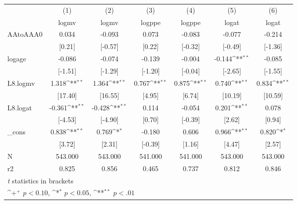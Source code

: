 {
\def\sym#1{\ifmmode^{#1}\else\(^{#1}\)\fi}
\begin{tabular}{l*{6}{c}}
\hline\hline
            &\multicolumn{1}{c}{(1)}&\multicolumn{1}{c}{(2)}&\multicolumn{1}{c}{(3)}&\multicolumn{1}{c}{(4)}&\multicolumn{1}{c}{(5)}&\multicolumn{1}{c}{(6)}\\
            &\multicolumn{1}{c}{logmv}&\multicolumn{1}{c}{logmv}&\multicolumn{1}{c}{logppe}&\multicolumn{1}{c}{logppe}&\multicolumn{1}{c}{logat}&\multicolumn{1}{c}{logat}\\
\hline
AAtoAAA0    &       0.034        &      -0.093        &       0.073        &      -0.083        &      -0.077        &      -0.214        \\
            &      [0.21]        &     [-0.57]        &      [0.22]        &     [-0.32]        &     [-0.49]        &     [-1.36]        \\
logage      &      -0.086        &      -0.074        &      -0.139        &      -0.004        &      -0.144\sym{**}&      -0.085        \\
            &     [-1.51]        &     [-1.29]        &     [-1.20]        &     [-0.04]        &     [-2.65]        &     [-1.55]        \\
L8.logmv    &       1.318\sym{**}&       1.364\sym{**}&       0.767\sym{**}&       0.875\sym{**}&       0.740\sym{**}&       0.834\sym{**}\\
            &     [17.40]        &     [16.55]        &      [4.95]        &      [6.74]        &     [10.19]        &     [10.59]        \\
L8.logat    &      -0.361\sym{**}&      -0.428\sym{**}&       0.114        &      -0.054        &       0.201\sym{**}&       0.078        \\
            &     [-4.53]        &     [-4.90]        &      [0.70]        &     [-0.39]        &      [2.62]        &      [0.94]        \\
\_cons      &       0.838\sym{**}&       0.769\sym{*} &      -0.180        &       0.606        &       0.966\sym{**}&       0.820\sym{*} \\
            &      [3.72]        &      [2.31]        &     [-0.39]        &      [1.16]        &      [4.47]        &      [2.57]        \\
\hline
N           &     543.000        &     543.000        &     541.000        &     541.000        &     543.000        &     543.000        \\
r2          &       0.825        &       0.856        &       0.465        &       0.737        &       0.812        &       0.846        \\
\hline\hline
\multicolumn{7}{l}{\footnotesize \textit{t} statistics in brackets}\\
\multicolumn{7}{l}{\footnotesize \sym{+} \(p<0.10\), \sym{*} \(p<0.05\), \sym{**} \(p<.01\)}\\
\end{tabular}
}
